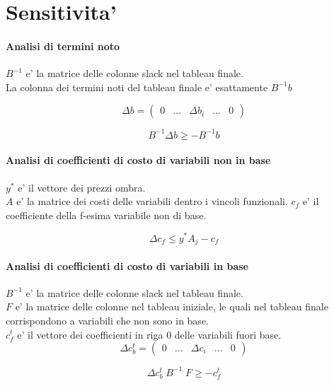 \section{Sensitivita'}

\paragraph{Analisi di termini noto}

$B^{-1}$ e' la matrice delle colonne slack nel tableau finale. \\
La colonna dei termini noti del tableau finale e' esattamente $B^{-1} b$

\[
    \Delta b =
    \begin{pmatrix}
        0 & ... & \Delta b_i & ... & 0
    \end{pmatrix}
\]

\[
    B^{-1} \Delta b \geq - B^{-1} b
\]

\paragraph{Analisi di coefficienti di costo di variabili non in base}

$y^{*}$ e' il vettore dei prezzi ombra. \\
$A$ e' la matrice dei costi delle variabili dentro i vincoli funzionali.
$c_f$ e' il coefficiente della f-esima variabile non di base.

\[
    \Delta c_f \leq y^{*} A_j - c_f
\]

\paragraph{Analisi di coefficienti di costo di variabili in base}

$B^{-1}$ e' la matrice delle colonne slack nel tableau finale. \\
$F$ e' la matrice delle colonne nel tableau iniziale, le quali nel tableau finale corrispondono a variabili che non sono in base. \\
$c^t_f$ e' il vettore dei coefficienti in riga 0 delle variabili fuori base. \\

\[
    \Delta c^t_b =
    \begin{pmatrix}
        0 & ... & \Delta c_i & ... & 0
    \end{pmatrix}
\]


\[
    \Delta c^t_b \; B^{-1} \; F \geq - c^t_f
\]
